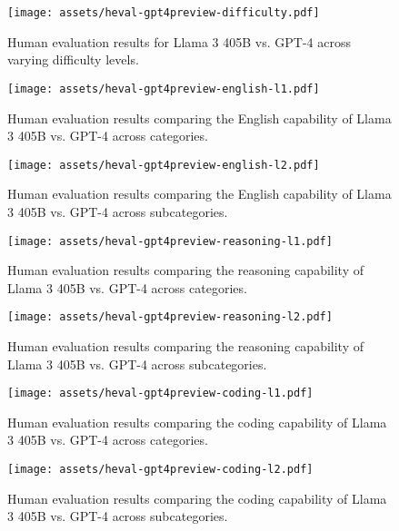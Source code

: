 \begin{figure}
    \centering
    \texttt{[image: assets/heval-gpt4preview-difficulty.pdf]}
    \caption{Human evaluation results for Llama 3 405B vs. GPT-4 across varying difficulty levels.}
    \label{fig:heval-gpt4o-difficulty}
\end{figure}


\begin{figure}
    \centering
    \texttt{[image: assets/heval-gpt4preview-english-l1.pdf]}
    \caption{Human evaluation results comparing the English capability of Llama 3 405B vs. GPT-4 across categories.}
    \label{fig:heval-gpt4o-english-l1.png}
\end{figure}


\begin{figure}
    \centering
    \texttt{[image: assets/heval-gpt4preview-english-l2.pdf]}
    \caption{Human evaluation results comparing the English capability of Llama 3 405B vs. GPT-4 across subcategories.}
    \label{fig:heval-gpt4o-english-l2.png}
\end{figure}



\begin{figure}
  \centering
  \texttt{[image: assets/heval-gpt4preview-reasoning-l1.pdf]}
  \caption{Human evaluation results comparing the reasoning capability of Llama 3 405B vs. GPT-4 across categories.}
  \label{fig:heval-gpt4o-reasoning-l1.png}
\end{figure}


\begin{figure}
  \centering
  \texttt{[image: assets/heval-gpt4preview-reasoning-l2.pdf]}
  \caption{Human evaluation results comparing the reasoning capability of Llama 3 405B vs. GPT-4 across subcategories.}
  \label{fig:heval-gpt4o-reasoning-l2.png}
\end{figure}


\begin{figure}
  \centering
  \texttt{[image: assets/heval-gpt4preview-coding-l1.pdf]}
  \caption{Human evaluation results comparing the coding capability of Llama 3 405B vs. GPT-4 across categories.}
  \label{fig:heval-gpt4o-coding-l1.png}
\end{figure}


\begin{figure}
  \centering
  \texttt{[image: assets/heval-gpt4preview-coding-l2.pdf]}
  \caption{Human evaluation results comparing the coding capability of Llama 3 405B vs. GPT-4 across subcategories.}
  \label{fig:heval-gpt4o-coding-l2.png}
\end{figure}




